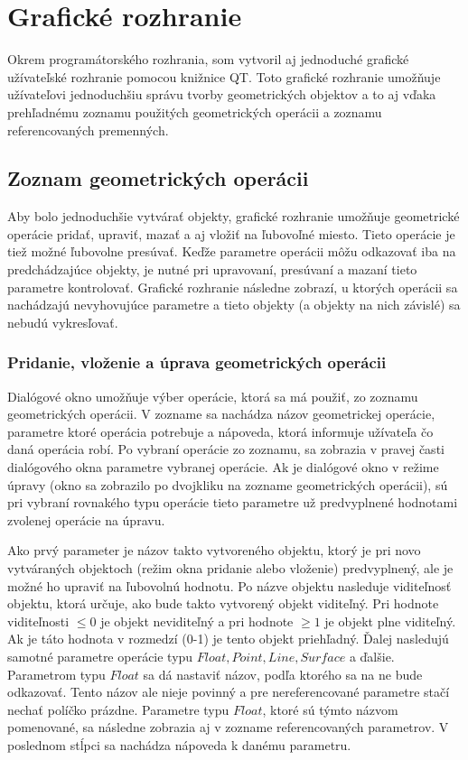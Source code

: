 \section{Grafické rozhranie}
Okrem programátorského rozhrania, som vytvoril aj jednoduché grafické užívateľské rozhranie pomocou knižnice QT. Toto grafické rozhranie umožňuje užívateľovi jednoduchšiu správu tvorby geometrických objektov a to aj vďaka prehľadnému zoznamu použitých geometrických operácii a zoznamu referencovaných premenných. 

\subsection{Zoznam geometrických operácii}
Aby bolo jednoduchšie vytvárať objekty, grafické rozhranie umožňuje geometrické operácie pridať, upraviť, mazať a aj vložiť na ľubovoľné miesto. Tieto operácie je tiež možné ľubovolne presúvať. Keďže parametre operácii môžu odkazovať iba na predchádzajúce objekty, je nutné pri upravovaní, presúvaní a mazaní tieto parametre kontrolovať. Grafické rozhranie následne zobrazí, u ktorých operácii sa nachádzajú nevyhovujúce parametre a tieto objekty (a objekty na nich závislé) sa nebudú vykresľovať.



\subsubsection{Pridanie, vloženie a úprava geometrických operácii} 
Dialógové okno umožňuje výber operácie,  ktorá sa má použiť, zo zoznamu geometrických operácii. V zozname sa nachádza názov geometrickej operácie, parametre ktoré operácia potrebuje a nápoveda, ktorá informuje užívateľa čo daná operácia robí.
Po vybraní operácie zo zoznamu, sa zobrazia v pravej časti dialógového okna parametre vybranej operácie. Ak je dialógové okno v režime úpravy (okno sa zobrazilo po dvojkliku na zozname geometrických operácii), sú pri vybraní rovnakého typu operácie tieto parametre už predvyplnené hodnotami zvolenej operácie na úpravu.

Ako prvý parameter je názov takto vytvoreného objektu, ktorý je pri novo vytváraných objektoch (režim okna pridanie alebo vloženie) predvyplnený, ale je možné ho upraviť na ľubovolnú hodnotu.  
Po názve objektu nasleduje viditeľnosť objektu, ktorá určuje, ako bude takto vytvorený objekt viditeľný. Pri hodnote viditeľnosti $\leq0$ je objekt neviditeľný a pri hodnote $\geq1$ je objekt plne viditeľný. Ak je táto hodnota v rozmedzí (0-1) je tento objekt priehľadný. 
Ďalej nasledujú samotné parametre operácie typu $Float,  Point, Line, Surface$ a ďalšie. Parametrom typu $Float$ sa dá nastaviť názov, podľa ktorého sa na ne bude odkazovať. Tento názov ale nieje povinný a pre nereferencované parametre stačí nechať políčko prázdne. Parametre typu $Float$, ktoré sú týmto názvom pomenované, sa následne zobrazia aj v zozname referencovaných parametrov.
V poslednom stĺpci sa nachádza nápoveda k danému parametru.

